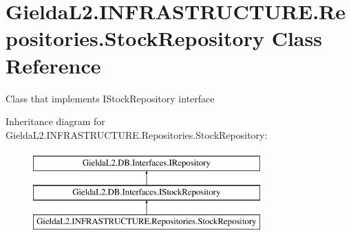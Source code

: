 \hypertarget{class_gielda_l2_1_1_i_n_f_r_a_s_t_r_u_c_t_u_r_e_1_1_repositories_1_1_stock_repository}{}\section{Gielda\+L2.\+I\+N\+F\+R\+A\+S\+T\+R\+U\+C\+T\+U\+R\+E.\+Repositories.\+Stock\+Repository Class Reference}
\label{class_gielda_l2_1_1_i_n_f_r_a_s_t_r_u_c_t_u_r_e_1_1_repositories_1_1_stock_repository}


Class that implements I\+Stock\+Repository interface  


Inheritance diagram for Gielda\+L2.\+I\+N\+F\+R\+A\+S\+T\+R\+U\+C\+T\+U\+R\+E.\+Repositories.\+Stock\+Repository\+:\begin{figure}[H]
\begin{center}
\leavevmode
\includegraphics[height=3.000000cm]{class_gielda_l2_1_1_i_n_f_r_a_s_t_r_u_c_t_u_r_e_1_1_repositories_1_1_stock_repository}
\end{center}
\end{figure}
